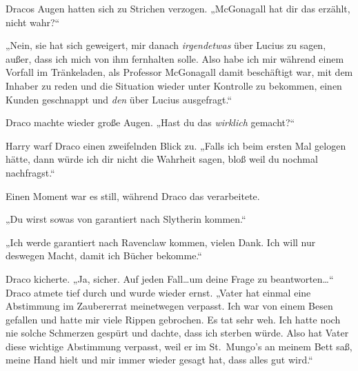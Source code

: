 Dracos Augen hatten sich zu Strichen verzogen. „McGonagall hat dir das erzählt, nicht wahr?“

„Nein, sie hat sich geweigert, mir danach \emph{irgendetwas} über Lucius zu sagen, außer, dass ich mich von ihm fernhalten solle. Also habe ich mir während einem Vorfall im Tränkeladen, als Professor McGonagall damit beschäftigt war, mit dem Inhaber zu reden und die Situation wieder unter Kontrolle zu bekommen, einen Kunden geschnappt und \emph{den} über Lucius ausgefragt.“

Draco machte wieder große Augen. „Hast du das \emph{wirklich} gemacht?“

Harry warf Draco einen zweifelnden Blick zu. „Falls ich beim ersten Mal gelogen hätte, dann würde ich dir nicht die Wahrheit sagen, bloß weil du nochmal nachfragst.“

Einen Moment war es still, während Draco das verarbeitete.

„Du wirst sowas von garantiert nach Slytherin kommen.“

„Ich werde garantiert nach Ravenclaw kommen, vielen Dank. Ich will nur deswegen Macht, damit ich Bücher bekomme.“

Draco kicherte. „Ja, sicher. Auf jeden Fall…um deine Frage zu beantworten…“ Draco atmete tief durch und wurde wieder ernst. „Vater hat einmal eine Abstimmung im Zaubererrat meinetwegen verpasst. Ich war von einem Besen gefallen und hatte mir viele Rippen gebrochen. Es tat sehr weh. Ich hatte noch nie solche Schmerzen gespürt und dachte, dass ich sterben würde. Also hat Vater diese wichtige Abstimmung verpasst, weil er im St.~Mungo’s an meinem Bett saß, meine Hand hielt und mir immer wieder gesagt hat, dass alles gut wird.“

